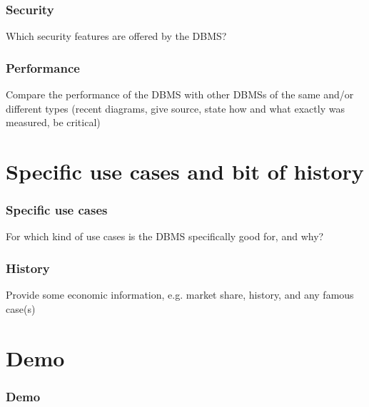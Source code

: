 \documentclass[aspectratio=169]{beamer}
\begin{document}
\begin{frame}
    \frametitle{Security}

    Which security features are offered by the DBMS?
\end{frame}

\begin{frame}
    \frametitle{Performance}

    Compare the performance of the DBMS with other DBMSs of the same and/or different
    types (recent diagrams, give source, state how and what exactly was measured, be critical)
\end{frame}

\section{Specific use cases and bit of history}

\begin{frame}
    \frametitle{Specific use cases}
    For which kind of use cases is the DBMS specifically good for, and why?
\end{frame}

\begin{frame}
    \frametitle{History}
    Provide some economic information, e.g. market share, history, and any famous case(s)
\end{frame}

\section{Demo}

\begin{frame}
    \frametitle{Demo}
\end{frame}
\end{document}
